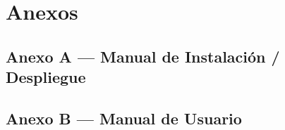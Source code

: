 \newpage
\section*{Anexos}

\subsection*{Anexo A — Manual de Instalación / Despliegue}


\subsection*{Anexo B — Manual de Usuario}



